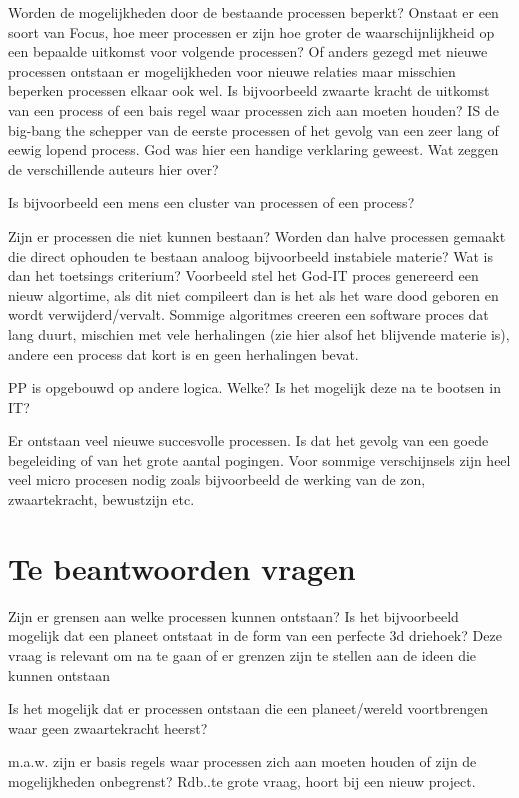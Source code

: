 \documentclass[a4paper]{Thesis}
\begin{document}
Worden de mogelijkheden door de bestaande processen beperkt? Onstaat er een soort van Focus, hoe meer processen er zijn hoe groter de waarschijnlijkheid op een bepaalde uitkomst voor volgende processen? Of anders gezegd met nieuwe processen ontstaan er mogelijkheden voor nieuwe relaties maar misschien beperken processen elkaar ook wel.
Is bijvoorbeeld zwaarte kracht de uitkomst van een process of een bais regel waar processen zich aan moeten houden?
IS de big-bang the schepper van de eerste processen of het gevolg van een zeer lang of eewig lopend process. God was hier een handige verklaring geweest.
Wat zeggen de verschillende auteurs hier over?

Is bijvoorbeeld een mens een cluster van processen of een process?

Zijn er processen die niet kunnen bestaan? Worden dan halve processen gemaakt die direct ophouden te bestaan analoog bijvoorbeeld instabiele materie?
Wat is dan het toetsings criterium? Voorbeeld stel het God-IT proces genereerd een nieuw algortime, als dit niet compileert dan is het als het ware dood geboren en wordt verwijderd/vervalt. Sommige algoritmes creeren een software proces dat lang duurt, mischien met vele herhalingen (zie hier alsof het blijvende materie is), andere een process dat kort is en geen herhalingen bevat.

PP is opgebouwd op andere logica. Welke? Is het mogelijk deze na te bootsen in IT?

Er ontstaan veel nieuwe succesvolle processen. Is dat het gevolg van een goede begeleiding of van het grote aantal pogingen. Voor sommige verschijnsels zijn heel veel micro procesen nodig zoals bijvoorbeeld de werking van de zon, zwaartekracht, bewustzijn etc.

\section{Te beantwoorden vragen}
Zijn er grensen aan welke processen kunnen ontstaan? Is het bijvoorbeeld mogelijk dat een planeet ontstaat in de form van een perfecte 3d driehoek?
Deze vraag is relevant om na te gaan of er grenzen zijn te stellen aan de ideen die kunnen ontstaan

Is het mogelijk dat er processen ontstaan die een planeet/wereld voortbrengen waar geen zwaartekracht heerst?

m.a.w. zijn er basis regels waar processen zich aan moeten houden of zijn de mogelijkheden onbegrenst? 
Rdb..te grote vraag, hoort bij een nieuw project.
\end{document}
